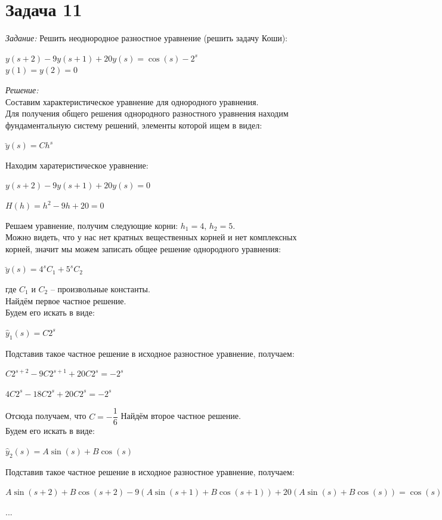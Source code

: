 \documentclass[14pt,fleqn]{extarticle}
\begin{document}
	\section*{Задача 11}
	\textit{Задание:} Решить неоднородное разностное уравнение (решить задачу $\mbox{Коши}$):
	\begin{center}
		$y(s+2) - 9y(s+1) + 20y(s) = \cos(s) - 2^s$\\
		$y(1) = y(2) = 0$
	\end{center}
	\textit{Решение:}\\
	Составим характеристическое уравнение для однородного уравнения.\\
	Для получения общего решения однородного разностного уравнения находим фундаментальную систему решений, элементы которой ищем в видел:
	\begin{center}
		$\breve{y}(s) = Ch^s$
	\end{center}
	Находим харатеристическое уравнение:
	\begin{center}
		$y(s+2) - 9y(s+1) + 20y(s) = 0$
	\end{center}
	\begin{center}
		$H(h) = h^2 - 9h + 20 = 0$
	\end{center}
	Решаем уравнение, получим следующие корни: $h_1 = 4$, $h_2 = 5$.\\
	Можно видеть, что у нас нет кратных вещественных корней и нет комплексных корней, значит мы можем записать общее решение однородного уравнения:
	\begin{center}
		$\breve{y}(s) = 4^sC_1 + 5^sC_2$
	\end{center}
	где $C_1$ и $C_2$ -- произвольные константы.\\
	
	Найдём первое частное решение.\\
	Будем его искать в виде:
	\begin{center}
		$\hat{y}_1(s) = C2^s$
	\end{center}
	Подставив такое частное решение в исходное разностное уравнение, получаем:
	\begin{center}
		$C2^{s+2} - 9C2^{s+1} + 20C2^s = -2^s$
	\end{center}
	\begin{center}
		$4C2^{s} - 18C2^{s} + 20C2^s = -2^s$
	\end{center}
	Отсюда получаем, что $C = -\dfrac{1}{6}$
	\newpage
	Найдём второе частное решение.\\
	Будем его искать в виде:
	\begin{center}
		$\hat{y}_2(s) = A \sin(s) + B \cos(s)$
	\end{center}
	Подставив такое частное решение в исходное разностное уравнение, получаем:
	\begin{center}
		\small$A \sin(s+2) + B \cos(s+2) - 9(A \sin(s+1) + B \cos(s+1)) + 20(A \sin(s) + B \cos(s)) = \cos(s)$
	\end{center}
	\begin{center}
		...
	\end{center}
	\newpage
\end{document}
